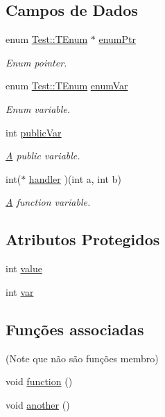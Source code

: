 \subsection*{Campos de Dados}
\begin{DoxyCompactItemize}
\item 
enum \hyperlink{class_test_a33e3643b66dfa91e4fb7cc663a23e166}{Test\-::\-T\-Enum} $\ast$ \hyperlink{class_test_a7c78a0b9e5e08842083ca6f3ac1243bd}{enum\-Ptr}
\begin{DoxyCompactList}\small\item\em Enum pointer. \end{DoxyCompactList}\item 
enum \hyperlink{class_test_a33e3643b66dfa91e4fb7cc663a23e166}{Test\-::\-T\-Enum} \hyperlink{class_test_aba61457e93a684d33eb93011cacd4202}{enum\-Var}
\begin{DoxyCompactList}\small\item\em Enum variable. \end{DoxyCompactList}\item 
int \hyperlink{class_test_a292887ac25652b1d8448430f583378c3}{public\-Var}
\begin{DoxyCompactList}\small\item\em \hyperlink{class_a}{A} public variable. \end{DoxyCompactList}\item 
int($\ast$ \hyperlink{class_test_a89099c88d24a6f3036140ecaccd2bb85}{handler} )(int a, int b)
\begin{DoxyCompactList}\small\item\em \hyperlink{class_a}{A} function variable. \end{DoxyCompactList}\end{DoxyCompactItemize}
\subsection*{Atributos Protegidos}
\begin{DoxyCompactItemize}
\item 
int \hyperlink{class_test_ac4f474c82e82cbb89ca7c36dd52be0ed}{value}
\item 
int \hyperlink{class_test_a96c77f9f3a7baec84b9b8add26a31787}{var}
\end{DoxyCompactItemize}
\subsection*{Funções associadas}
(Note que não são funções membro) \begin{DoxyCompactItemize}
\item 
void \hyperlink{class_test_a51a683fa4fcec142ab1574e00a7b6860}{function} ()
\item 
void \hyperlink{class_test_a1283d836e0611ff772c1b06a31ecbbfe}{another} ()
\end{DoxyCompactItemize}
